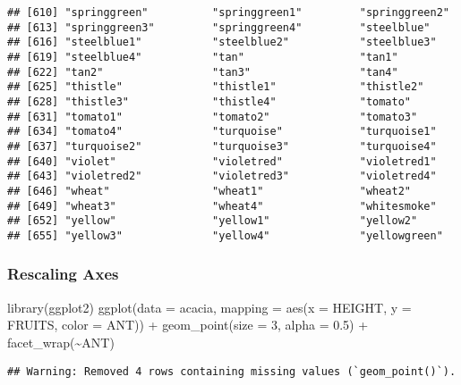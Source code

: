 \documentclass[
]{article}
\newenvironment{Shaded}{\begin{snugshade}}{\end{snugshade}}
\newcommand{\AttributeTok}[1]{\textcolor[rgb]{0.77,0.63,0.00}{#1}}
\newcommand{\DecValTok}[1]{\textcolor[rgb]{0.00,0.00,0.81}{#1}}
\newcommand{\FloatTok}[1]{\textcolor[rgb]{0.00,0.00,0.81}{#1}}
\newcommand{\FunctionTok}[1]{\textcolor[rgb]{0.00,0.00,0.00}{#1}}
\newcommand{\NormalTok}[1]{#1}
\newcommand{\SpecialCharTok}[1]{\textcolor[rgb]{0.00,0.00,0.00}{#1}}
\begin{document}
\begin{verbatim}
## [610] "springgreen"          "springgreen1"         "springgreen2"        
## [613] "springgreen3"         "springgreen4"         "steelblue"           
## [616] "steelblue1"           "steelblue2"           "steelblue3"          
## [619] "steelblue4"           "tan"                  "tan1"                
## [622] "tan2"                 "tan3"                 "tan4"                
## [625] "thistle"              "thistle1"             "thistle2"            
## [628] "thistle3"             "thistle4"             "tomato"              
## [631] "tomato1"              "tomato2"              "tomato3"             
## [634] "tomato4"              "turquoise"            "turquoise1"          
## [637] "turquoise2"           "turquoise3"           "turquoise4"          
## [640] "violet"               "violetred"            "violetred1"          
## [643] "violetred2"           "violetred3"           "violetred4"          
## [646] "wheat"                "wheat1"               "wheat2"              
## [649] "wheat3"               "wheat4"               "whitesmoke"          
## [652] "yellow"               "yellow1"              "yellow2"             
## [655] "yellow3"              "yellow4"              "yellowgreen"
\end{verbatim}

\hypertarget{rescaling-axes}{%
\subsubsection{Rescaling Axes}\label{rescaling-axes}}

\begin{Shaded}
\begin{Highlighting}[]
\FunctionTok{library}\NormalTok{(ggplot2)}
\FunctionTok{ggplot}\NormalTok{(}\AttributeTok{data =}\NormalTok{ acacia, }\AttributeTok{mapping =} \FunctionTok{aes}\NormalTok{(}\AttributeTok{x =}\NormalTok{ HEIGHT, }\AttributeTok{y =}\NormalTok{ FRUITS, }\AttributeTok{color =}\NormalTok{ ANT)) }\SpecialCharTok{+} 
  \FunctionTok{geom\_point}\NormalTok{(}\AttributeTok{size =} \DecValTok{3}\NormalTok{, }\AttributeTok{alpha =} \FloatTok{0.5}\NormalTok{) }\SpecialCharTok{+}
  \FunctionTok{facet\_wrap}\NormalTok{(}\SpecialCharTok{\textasciitilde{}}\NormalTok{ANT)}
\end{Highlighting}
\end{Shaded}

\begin{verbatim}
## Warning: Removed 4 rows containing missing values (`geom_point()`).
\end{verbatim}
\end{document}
